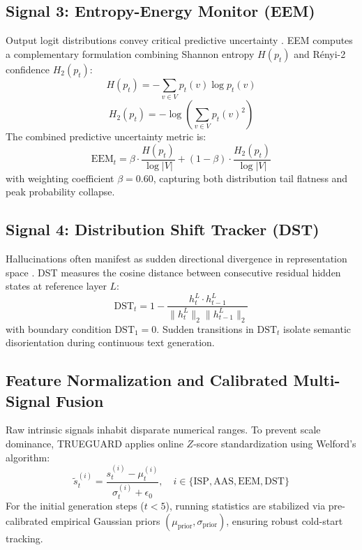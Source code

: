 \documentclass[journal]{IEEEtran}
\begin{document}
\subsection{Signal 3: Entropy-Energy Monitor (EEM)}
Output logit distributions convey critical predictive uncertainty \cite{ma2024semantic}. EEM computes a complementary formulation combining Shannon entropy $H(p_t)$ and R\'enyi-2 confidence $H_2(p_t)$:
\begin{equation}
    H(p_t) = -\sum_{v \in V} p_t(v) \log p_t(v)
\end{equation}
\begin{equation}
    H_2(p_t) = -\log \left( \sum_{v \in V} p_t(v)^2 \right)
\end{equation}
The combined predictive uncertainty metric is:
\begin{equation}
    \text{EEM}_t = \beta \cdot \frac{H(p_t)}{\log |V|} + (1 - \beta) \cdot \frac{H_2(p_t)}{\log |V|}
\end{equation}
with weighting coefficient $\beta = 0.60$, capturing both distribution tail flatness and peak probability collapse.

\subsection{Signal 4: Distribution Shift Tracker (DST)}
Hallucinations often manifest as sudden directional divergence in representation space \cite{dasgupta2025hallushift}. DST measures the cosine distance between consecutive residual hidden states at reference layer $L$:
\begin{equation}
    \text{DST}_t = 1 - \frac{h_t^L \cdot h_{t-1}^L}{\|h_t^L\|_2 \|h_{t-1}^L\|_2}
\end{equation}
with boundary condition $\text{DST}_1 = 0$. Sudden transitions in $\text{DST}_t$ isolate semantic disorientation during continuous text generation.

\subsection{Feature Normalization and Calibrated Multi-Signal Fusion}
Raw intrinsic signals inhabit disparate numerical ranges. To prevent scale dominance, TRUEGUARD applies online $Z$-score standardization using Welford's algorithm:
\begin{equation}
    \tilde{s}_t^{(i)} = \frac{s_t^{(i)} - \mu_t^{(i)}}{\sigma_t^{(i)} + \epsilon_0}, \quad i \in \{\text{ISP}, \text{AAS}, \text{EEM}, \text{DST}\}
\end{equation}
For the initial generation steps ($t < 5$), running statistics are stabilized via pre-calibrated empirical Gaussian priors $(\mu_{\text{prior}}, \sigma_{\text{prior}})$, ensuring robust cold-start tracking.
\end{document}
